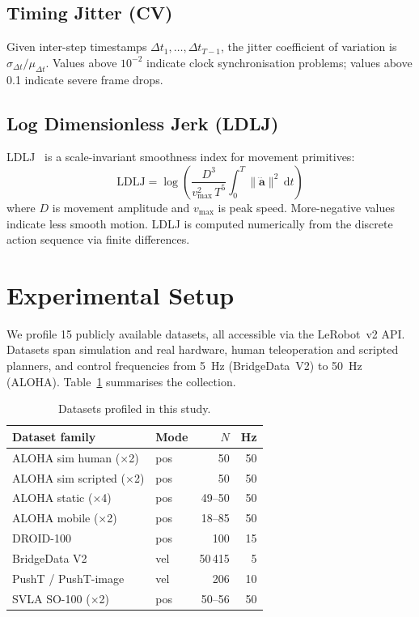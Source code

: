 \documentclass[10pt,twocolumn]{article}
\begin{document}
\subsection{Timing Jitter (CV)}

Given inter-step timestamps $\Delta t_1, \ldots, \Delta t_{T-1}$, the jitter
coefficient of variation is $\sigma_{\Delta t} / \mu_{\Delta t}$.  Values
above $10^{-2}$ indicate clock synchronisation problems; values above 0.1
indicate severe frame drops.

\subsection{Log Dimensionless Jerk (LDLJ)}

LDLJ~\cite{balasubramanian2012} is a scale-invariant smoothness index for
movement primitives:
\[
  \mathrm{LDLJ} = \log\!\left(
    \frac{D^3}{v_{\max}^2 \, T^5}
    \int_0^T \|\dddot{\mathbf{a}}\|^2 \, \mathrm{d}t
  \right)
\]
where $D$ is movement amplitude and $v_{\max}$ is peak speed. More-negative
values indicate less smooth motion. LDLJ is computed numerically from the
discrete action sequence via finite differences.

\section{Experimental Setup}
\label{sec:experiments}

We profile 15 publicly available datasets, all accessible via the LeRobot~v2
API. Datasets span simulation and real hardware, human teleoperation and
scripted planners, and control frequencies from 5~Hz (BridgeData~V2) to
50~Hz (ALOHA). Table~\ref{tab:datasets} summarises the collection.

\begin{table}[htbp]
\centering
\small
\caption{Datasets profiled in this study.}
\label{tab:datasets}
\begin{tabular}{llrr}
\toprule
Dataset family & Mode & $N$ & Hz \\
\midrule
ALOHA sim human (×2)    & pos & 50 & 50 \\
ALOHA sim scripted (×2) & pos & 50 & 50 \\
ALOHA static (×4)       & pos & 49–50 & 50 \\
ALOHA mobile (×2)       & pos & 18–85 & 50 \\
DROID-100               & pos & 100 & 15 \\
BridgeData V2           & vel & 50\,415 & 5 \\
PushT / PushT-image     & vel & 206 & 10 \\
SVLA SO-100 (×2)        & pos & 50–56 & 50 \\
\bottomrule
\end{tabular}
\end{table}
\end{document}

